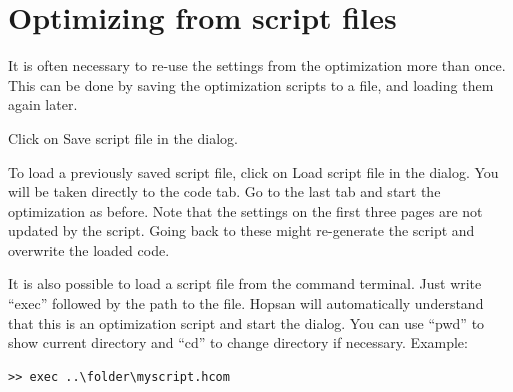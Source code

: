 \documentclass[a4paper,pdftex]{article}
\begin{document}
\section*{Optimizing from script files}
It is often necessary to re-use the settings from the optimization more than once. This can be done by saving the optimization scripts to a file, and loading them again later.

\begin{tutenumerate}
\vspace{-\baselineskip}

Click on Save script file in the dialog.

To load a previously saved script file, click on Load script file in the dialog. You will be taken directly to the code tab. Go to the last tab and start the optimization as before. Note that the settings on the first three pages are not updated by the script. Going back to these might re-generate the script and overwrite the loaded code.

It is also possible to load a script file from the command terminal. Just write \enquote{exec} followed by the path to the file. Hopsan will automatically understand that this is an optimization script and start the dialog. You can use \enquote{pwd} to show current directory and \enquote{cd} to change directory if necessary. Example:	
\begin{verbatim}
>> exec ..\folder\myscript.hcom
\end{verbatim}

\end{tutenumerate}
\end{document}
